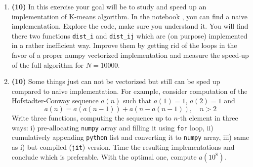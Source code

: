 \documentclass[prb,papersize=a4paper,notitlepage]{revtex4-2}%
\begin{document}
\begin{enumerate}
\item \textbf{(10)} In this exercise your goal will be to study and speed up an implementation of \href{https://en.wikipedia.org/wiki/K-means_clustering}{K-means algorithm}. In the notebook , you can find a naive implementation. Explore the code, make sure you understand it. You will find there two functions \texttt{dist\_i} and \texttt{dist\_ij} which are (on purpose) implemented in a rather inefficient way. Improve them by getting rid of the loops in the favor of a proper numpy vectorized implementation and measure the speed-up of the full algorithm for $N=10000$.

\item \textbf{(10)} Some things just can not be vectorized but still can be sped up compared to naive implementation. For example, consider computation of the \href{https://mathworld.wolfram.com/Hofstadter-Conway10000-DollarSequence.html}{Hofstadter-Conway sequence} $a(n)$ such that $a(1)=1$, $a(2)=1$ and
\begin{equation}
a(n) = a(a(n-1)) + a(n-a(n-1)),\quad n > 2
\end{equation}
Write three functions, computing the sequence up to $n$-th element in three ways: i) pre-allocating \texttt{numpy} array and filling it using \texttt{for} loop, ii) cumulatively appending \texttt{python} list and converting it to \texttt{numpy} array, iii) same as i)  but compiled (\texttt{jit}) version. Time the resulting implementations and conclude which is preferable. With the optimal one, compute $a(10^8)$.


\end{enumerate}
\end{document}
